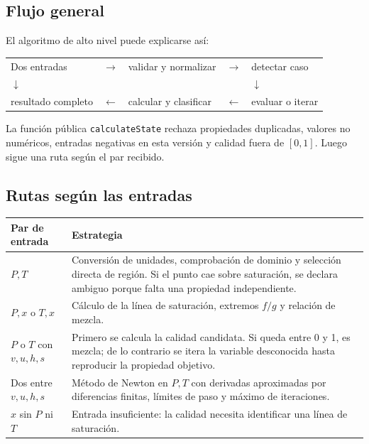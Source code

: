\documentclass[11pt,a4paper,oneside]{article}
\newcommand{\code}[1]{\texttt{#1}}
\begin{document}
\subsection{Flujo general}

El algoritmo de alto nivel puede explicarse as\'i:

\begin{center}
\begin{tabularx}{0.96\linewidth}{>{\centering\arraybackslash}X c >{\centering\arraybackslash}X c >{\centering\arraybackslash}X}
Dos entradas & $\longrightarrow$ & validar y normalizar & $\longrightarrow$ & detectar caso \\
\addlinespace
$\downarrow$ & & & & $\downarrow$ \\
resultado completo & $\longleftarrow$ & calcular y clasificar & $\longleftarrow$ & evaluar o iterar
\end{tabularx}
\end{center}

La funci\'on p\'ublica \code{calculateState} rechaza propiedades duplicadas, valores no num\'ericos, entradas negativas en esta versi\'on y calidad fuera de $[0,1]$. Luego sigue una ruta seg\'un el par recibido.

\subsection{Rutas seg\'un las entradas}

\begin{longtable}{p{3.0cm}p{10.9cm}}
\toprule
Par de entrada & Estrategia \\
\midrule
\endhead
$P,T$ & Conversi\'on de unidades, comprobaci\'on de dominio y selecci\'on directa de regi\'on. Si el punto cae sobre saturaci\'on, se declara ambiguo porque falta una propiedad independiente. \\
$P,x$ o $T,x$ & C\'alculo de la l\'inea de saturaci\'on, extremos $f/g$ y relaci\'on de mezcla. \\
$P$ o $T$ con $v,u,h,s$ & Primero se calcula la calidad candidata. Si queda entre 0 y 1, es mezcla; de lo contrario se itera la variable desconocida hasta reproducir la propiedad objetivo. \\
Dos entre $v,u,h,s$ & M\'etodo de Newton en $P,T$ con derivadas aproximadas por diferencias finitas, l\'imites de paso y m\'aximo de iteraciones. \\
$x$ sin $P$ ni $T$ & Entrada insuficiente: la calidad necesita identificar una l\'inea de saturaci\'on. \\
\bottomrule
\end{longtable}
\end{document}
